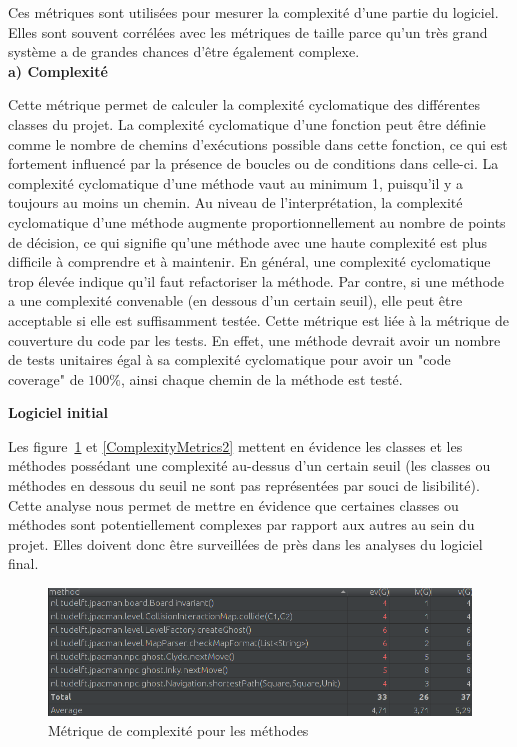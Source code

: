 \documentclass[12pt, openany]{report}
\begin{document}
Ces métriques sont utilisées pour mesurer la complexité d’une partie du logiciel. Elles sont souvent corrélées avec les métriques de taille parce qu’un très grand système a de grandes chances d’être également complexe.\\

\textbf{a) Complexité}


Cette métrique permet de calculer la complexité cyclomatique des différentes classes du projet. La complexité cyclomatique d'une fonction peut être définie comme le nombre de chemins d'exécutions possible dans cette fonction, ce qui est fortement influencé par la présence de boucles ou de conditions dans celle-ci. La complexité cyclomatique d'une méthode vaut au minimum 1, puisqu'il y a toujours au moins un chemin. Au niveau de l'interprétation, la complexité cyclomatique d'une méthode augmente proportionnellement au nombre de points de décision, ce qui signifie qu'une méthode avec une haute complexité est plus difficile à comprendre et à maintenir. En général, une complexité cyclomatique trop élevée indique qu'il faut refactoriser la méthode. Par contre, si une méthode a une complexité convenable (en dessous d'un certain seuil), elle peut être acceptable si elle est suffisamment testée. Cette métrique est liée à la métrique de couverture du code par les tests. En effet, une méthode devrait avoir un nombre de tests unitaires égal à sa complexité cyclomatique pour avoir un "code coverage" de $100\%$, ainsi chaque chemin de la méthode est testé.

\textbf{Logiciel initial}

Les figure~\ref{ComplexityMetrics1} et \ref{ComplexityMetrics2}  mettent en évidence les classes et les méthodes possédant une complexité au-dessus d'un certain seuil (les classes ou méthodes en dessous du seuil ne sont pas représentées par souci de lisibilité). Cette analyse nous permet de mettre en évidence que certaines classes ou méthodes sont potentiellement complexes par rapport aux autres au sein du projet. Elles doivent donc être surveillées de près dans les analyses du logiciel final.


\begin{figure}[!h]
	\centering
	\includegraphics[scale=0.6]{Images/ComplexityMetrics1.png} 
	\caption{Métrique de complexité pour les méthodes}
	\label{ComplexityMetrics1}
\end{figure}
\end{document}
